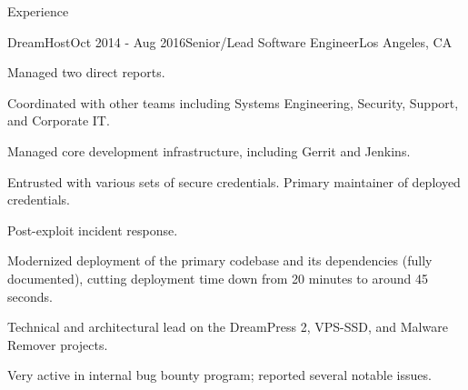 \documentclass{resume} %
\begin{document}
\begin{rSection}{Experience}
\begin{rSubsection}{DreamHost}{Oct 2014 - Aug 2016}{Senior/Lead Software Engineer}{Los Angeles, CA}
\item Managed two direct reports.
\item Coordinated with other teams including Systems Engineering, Security, Support, and Corporate IT.
\item Managed core development infrastructure, including Gerrit and Jenkins.
\item Entrusted with various sets of secure credentials. Primary maintainer of deployed credentials.
\item Post-exploit incident response.
\item Modernized deployment of the primary codebase and its dependencies (fully documented), cutting deployment time down from 20 minutes to around 45 seconds.
\item Technical and architectural lead on the DreamPress 2, VPS-SSD, and Malware Remover projects.
\item Very active in internal bug bounty program; reported several notable issues.
\end{rSubsection}



\end{rSection}
\end{document}

